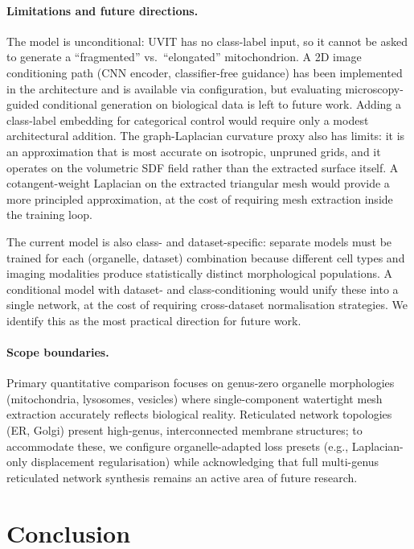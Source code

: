 \documentclass[10pt, a4paper, twocolumn]{article}
\begin{document}
\paragraph{Limitations and future directions.}
The model is unconditional: UVIT has no class-label input, so it cannot be asked to generate a ``fragmented'' vs.\ ``elongated'' mitochondrion. A 2D image conditioning path (CNN encoder, classifier-free guidance) has been implemented in the architecture and is available via configuration, but evaluating microscopy-guided conditional generation on biological data is left to future work. Adding a class-label embedding for categorical control would require only a modest architectural addition. The graph-Laplacian curvature proxy also has limits: it is an approximation that is most accurate on isotropic, unpruned grids, and it operates on the volumetric SDF field rather than the extracted surface itself. A cotangent-weight Laplacian on the extracted triangular mesh would provide a more principled approximation, at the cost of requiring mesh extraction inside the training loop.

The current model is also class- and dataset-specific: separate models must be trained for each (organelle, dataset) combination because different cell types and imaging modalities produce statistically distinct morphological populations. A conditional model with dataset- and class-conditioning would unify these into a single network, at the cost of requiring cross-dataset normalisation strategies. We identify this as the most practical direction for future work.

\paragraph{Scope boundaries.}
Primary quantitative comparison focuses on genus-zero organelle morphologies (mitochondria, lysosomes, vesicles) where single-component watertight mesh extraction accurately reflects biological reality. Reticulated network topologies (ER, Golgi) present high-genus, interconnected membrane structures; to accommodate these, we configure organelle-adapted loss presets (e.g., Laplacian-only displacement regularisation) while acknowledging that full multi-genus reticulated network synthesis remains an active area of future research.

\section{Conclusion}
\label{sec:conclusion}
\end{document}
